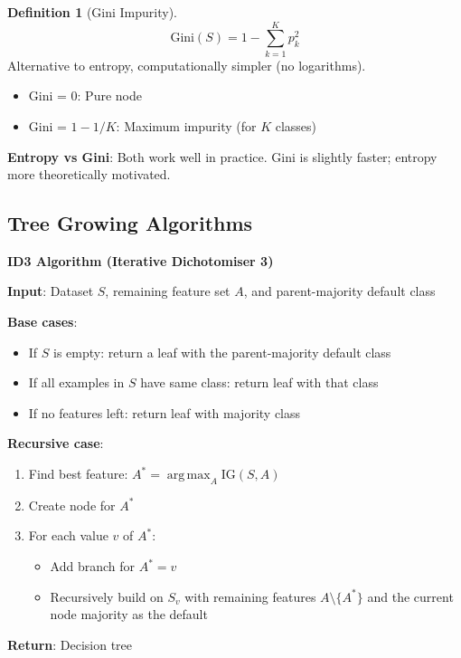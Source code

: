 \documentclass[11pt,twoside]{article}
\numberwithin{equation}{section}
\DeclareMathOperator*{\argmax}{arg\,max}
\theoremstyle{plain}
\theoremstyle{definition}
\newtheorem{definition}[theorem]{Definition}
\theoremstyle{remark}
\begin{document}
\begin{definition}[Gini Impurity]
\[
\text{Gini}(S) = 1 - \sum_{k=1}^K p_k^2
\]
Alternative to entropy, computationally simpler (no logarithms).
\begin{itemize}
\item Gini = 0: Pure node
\item Gini = $1 - 1/K$: Maximum impurity (for $K$ classes)
\end{itemize}
\end{definition}

\textbf{Entropy vs Gini}: Both work well in practice. Gini is slightly faster; entropy more theoretically motivated.

\subsection{Tree Growing Algorithms}

\begin{algorithmbox}
\textbf{ID3 Algorithm (Iterative Dichotomiser 3)}

\textbf{Input}: Dataset $S$, remaining feature set $A$, and parent-majority default class

\textbf{Base cases}:
\begin{itemize}
\item If $S$ is empty: return a leaf with the parent-majority default class
\item If all examples in $S$ have same class: return leaf with that class
\item If no features left: return leaf with majority class
\end{itemize}

\textbf{Recursive case}:
\begin{enumerate}
\item Find best feature: $A^* = \argmax_A \text{IG}(S, A)$
\item Create node for $A^*$
\item For each value $v$ of $A^*$:
\begin{itemize}
\item Add branch for $A^* = v$
\item Recursively build on $S_v$ with remaining features $A\setminus\{A^*\}$ and the current node majority as the default
\end{itemize}
\end{enumerate}

\textbf{Return}: Decision tree
\end{algorithmbox}
\end{document}
